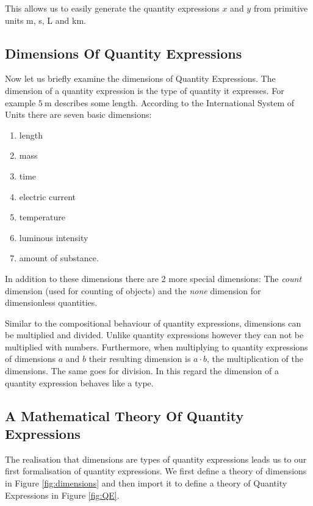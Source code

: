 This allows us to easily generate the quantity expressions $x$ and $y$ from primitive units m, s, L and km.

\subsection{Dimensions Of Quantity Expressions}
Now let us briefly examine the dimensions of Quantity Expressions. The dimension of a quantity expression is the type of quantity it expresses. For example $5\ \text{m}$ describes some length. According to the International System of Units \cite{sispec} there are seven basic dimensions:
\begin{enumerate}
  \item length
  \item mass
  \item time
  \item electric current
  \item temperature
  \item luminous intensity
  \item amount of substance.
\end{enumerate}

In addition to these dimensions there are 2 more special dimensions: The \textit{count} dimension (used for counting of objects) and the \textit{none} dimension for dimensionless quantities. 

Similar to the compositional behaviour of quantity expressions, dimensions can be multiplied and divided. Unlike quantity expressions however they can not be multiplied with numbers. Furthermore, when multiplying to quantity expressions of dimensions $a$ and $b$ their resulting dimension is $a \cdot{} b$, the multiplication of the dimensions. The same goes for division. In this regard the dimension of a quantity expression behaves like a type.

\subsection{A Mathematical Theory Of Quantity Expressions}
\label{sec:qeform}

The realisation that dimensions are types of quantity expressions leads us to our first formalisation of quantity expressions. We first define a theory of dimensions in Figure \ref{fig:dimensions} and then import it to define a theory of Quantity Expressions in Figure \ref{fig:QE}.



